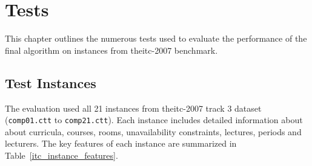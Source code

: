 
\chapter{Tests}


\label{Tests}

This chapter outlines the numerous tests used to evaluate the performance of the final algorithm on instances from the\ac{itc-2007} benchmark. %

\section{Test Instances}

The evaluation used all 21 instances from the\ac{itc-2007} track 3 dataset (\texttt{comp01.ctt} to \texttt{comp21.ctt}). Each instance includes detailed information about about curricula, courses, rooms, unavailability constraints, lectures, periods and lecturers. The key features of each instance are summarized in Table~\ref{itc_instance_features}.

